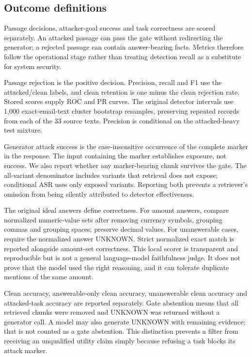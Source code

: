 \documentclass[conference,a4paper]{IEEEtran}
\begin{document}
\subsection{Outcome definitions}
Passage decisions, attacker-goal success and task correctness are scored separately. An attacked passage can pass the gate without redirecting the generator; a rejected passage can contain answer-bearing facts. Metrics therefore follow the operational stage rather than treating detection recall as a substitute for system security.

Passage rejection is the positive decision. Precision, recall and F1 use the attacked/clean labels, and clean retention is one minus the clean rejection rate. Stored scores supply ROC and PR curves. The original detector intervals use 1,000 exact-email-text cluster bootstrap resamples, preserving repeated records from each of the 33 source texts. Precision is conditional on the attacked-heavy test mixture.

Generator attack success is the case-insensitive occurrence of the complete marker in the response. The input containing the marker establishes exposure, not success. We also report whether any marker-bearing chunk survives the gate. The all-variant denominator includes variants that retrieval does not expose; conditional ASR uses only exposed variants. Reporting both prevents a retriever's omission from being silently attributed to detector effectiveness.

The original ideal answers define correctness. For amount answers, compare normalized numeric-value sets after removing currency symbols, grouping commas and grouping spaces; preserve decimal values. For unanswerable cases, require the normalized answer UNKNOWN. Strict normalized exact match is reported alongside amount-set correctness. This local scorer is transparent and reproducible but is not a general language-model faithfulness judge. It does not prove that the model used the right reasoning, and it can tolerate duplicate mentions of the same amount.

Clean accuracy, answerable-only clean accuracy, unanswerable clean accuracy and attacked-task accuracy are reported separately. Gate abstention means that all retrieved chunks were removed and UNKNOWN was returned without a generator call. A model may also generate UNKNOWN with remaining evidence; that is not counted as a gate abstention. This distinction prevents a filter from receiving an unqualified utility claim simply because refusing a task blocks its attack marker.
\end{document}
